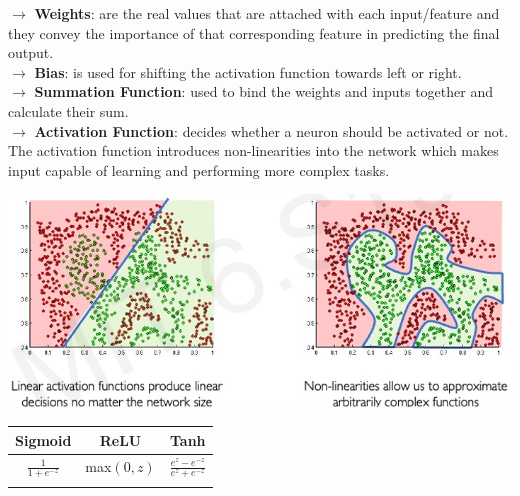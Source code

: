 \documentclass[letterpaper, 10.5pt,landscape]{article}
\begin{document}
\begin{multicols*}{3}
$\rightarrow$ \textbf{Weights}: are the real values that are attached with each input/feature and they convey the importance of that corresponding feature in predicting the final output. \\
$\rightarrow$ \textbf{Bias}: is used for shifting the activation function towards left or right.\\
$\rightarrow$ \textbf{Summation Function}: used to bind the weights and inputs together and calculate their sum. \\
$\rightarrow$ \textbf{Activation Function}: decides whether a neuron should be activated or not. The activation function introduces non-linearities into the network which makes input capable of learning and performing more complex tasks. 

\vspace{-5pt}
\begin{center}
    \begin{minipage}{\linewidth}
    \includegraphics[width=\textwidth]{figures/activation_function_need.png}
    \end{minipage}
\end{center}
\vspace{-5pt}


\vspace{-1mm}
\begin{center}
\begin{tabular}{c|c|c}
          Sigmoid & ReLU & Tanh\\
         \hline
         \rule{0pt}{3ex}
         $\frac{1}{1+e^{-z}} $  & max$(0,z)$ & $\frac{e^z - e^{-z}}{e^z + e^{-z}}$\\
           &   &  \vspace{-2mm}\\


\end{tabular}
\end{center}
\end{multicols*}
\end{document}
